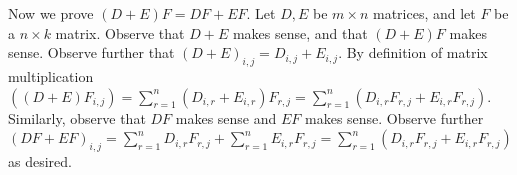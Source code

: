 \documentclass{article}
\begin{document}
\vs

Now we prove $(D+E)F=DF+EF$. Let $D, E$ be $m\times n$ matrices, and let $F$ be a $n\times k$ matrix. Observe that $D+E$ makes sense, and that $(D+E)F$ makes sense. Observe further that $(D+E)_{i,j}=D_{i,j}+E_{i,j}$. By definition of matrix multiplication $((D+E)F_{i,j})=\sum_{r=1}^{n} (D_{i,r}+E_{i,r}) F_{r,j}=\sum_{r=1}^{n} (D_{i,r} F_{r,j}+E_{i,r} F_{r,j})$. Similarly, observe that $DF$ makes sense and $EF$ makes sense. Observe further $(DF+EF)_{i,j}=\sum_{r=1}^{n} D_{i,r} F_{r,j} + \sum_{r=1}^{n} E_{i,r} F_{r,j}=\sum_{r=1}^{n} (D_{i,r} F_{r,j} + E_{i,r} F_{r,j})$ as desired.
\end{document}
